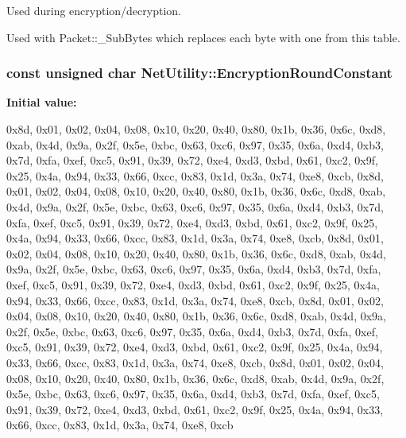 Used during encryption/decryption. 

Used with Packet::\_\-SubBytes which replaces each byte with one from this table. \hypertarget{class_net_utility_ab7bcf3b3ff54908eb12a3592e2c529e9}{
\subsubsection[{EncryptionRoundConstant}]{\setlength{\rightskip}{0pt plus 5cm}const unsigned char {\bf NetUtility::EncryptionRoundConstant}}}
\label{class_net_utility_ab7bcf3b3ff54908eb12a3592e2c529e9}
{\bfseries Initial value:}
\begin{DoxyCode}

        {
                0x8d, 0x01, 0x02, 0x04, 0x08, 0x10, 0x20, 0x40, 0x80, 0x1b, 0x36,
       0x6c, 0xd8, 0xab, 0x4d, 0x9a, 
                0x2f, 0x5e, 0xbc, 0x63, 0xc6, 0x97, 0x35, 0x6a, 0xd4, 0xb3, 0x7d,
       0xfa, 0xef, 0xc5, 0x91, 0x39, 
                0x72, 0xe4, 0xd3, 0xbd, 0x61, 0xc2, 0x9f, 0x25, 0x4a, 0x94, 0x33,
       0x66, 0xcc, 0x83, 0x1d, 0x3a, 
                0x74, 0xe8, 0xcb, 0x8d, 0x01, 0x02, 0x04, 0x08, 0x10, 0x20, 0x40,
       0x80, 0x1b, 0x36, 0x6c, 0xd8, 
                0xab, 0x4d, 0x9a, 0x2f, 0x5e, 0xbc, 0x63, 0xc6, 0x97, 0x35, 0x6a,
       0xd4, 0xb3, 0x7d, 0xfa, 0xef, 
                0xc5, 0x91, 0x39, 0x72, 0xe4, 0xd3, 0xbd, 0x61, 0xc2, 0x9f, 0x25,
       0x4a, 0x94, 0x33, 0x66, 0xcc, 
                0x83, 0x1d, 0x3a, 0x74, 0xe8, 0xcb, 0x8d, 0x01, 0x02, 0x04, 0x08,
       0x10, 0x20, 0x40, 0x80, 0x1b, 
                0x36, 0x6c, 0xd8, 0xab, 0x4d, 0x9a, 0x2f, 0x5e, 0xbc, 0x63, 0xc6,
       0x97, 0x35, 0x6a, 0xd4, 0xb3, 
                0x7d, 0xfa, 0xef, 0xc5, 0x91, 0x39, 0x72, 0xe4, 0xd3, 0xbd, 0x61,
       0xc2, 0x9f, 0x25, 0x4a, 0x94, 
                0x33, 0x66, 0xcc, 0x83, 0x1d, 0x3a, 0x74, 0xe8, 0xcb, 0x8d, 0x01,
       0x02, 0x04, 0x08, 0x10, 0x20, 
                0x40, 0x80, 0x1b, 0x36, 0x6c, 0xd8, 0xab, 0x4d, 0x9a, 0x2f, 0x5e,
       0xbc, 0x63, 0xc6, 0x97, 0x35, 
                0x6a, 0xd4, 0xb3, 0x7d, 0xfa, 0xef, 0xc5, 0x91, 0x39, 0x72, 0xe4,
       0xd3, 0xbd, 0x61, 0xc2, 0x9f, 
                0x25, 0x4a, 0x94, 0x33, 0x66, 0xcc, 0x83, 0x1d, 0x3a, 0x74, 0xe8,
       0xcb, 0x8d, 0x01, 0x02, 0x04, 
                0x08, 0x10, 0x20, 0x40, 0x80, 0x1b, 0x36, 0x6c, 0xd8, 0xab, 0x4d,
       0x9a, 0x2f, 0x5e, 0xbc, 0x63, 
                0xc6, 0x97, 0x35, 0x6a, 0xd4, 0xb3, 0x7d, 0xfa, 0xef, 0xc5, 0x91,
       0x39, 0x72, 0xe4, 0xd3, 0xbd, 
                0x61, 0xc2, 0x9f, 0x25, 0x4a, 0x94, 0x33, 0x66, 0xcc, 0x83, 0x1d,
       0x3a, 0x74, 0xe8, 0xcb
        }
\end{DoxyCode}


